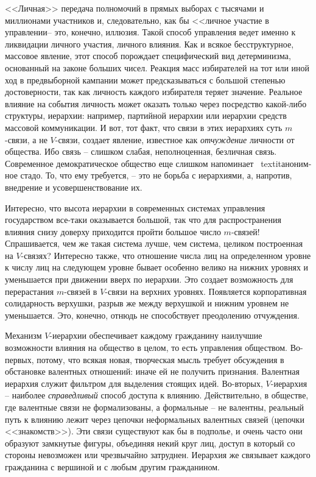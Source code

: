 \documentclass{book}
\begin{document}
<<Личная>> передача полномочий в прямых выборах с тысячами и миллионами участников и, следовательно, как бы <<личное уча­стие в управлении-- это, конечно, иллюзия. Такой способ управле­ния ведет именно к ликвидации личного участия, личного влия­ния. Как и всякое бесструктурное, массовое явление, этот спо­соб порождает специфический вид детерминизма, основанный на законе больших чисел. Реакция масс избирателей на тот или иной ход в предвыборной кампании может предсказываться с большой степенью достоверности, так как личность каждо­го избирателя теряет значение. Реальное влияние на события личность может оказать только через посредство какой-либо структуры, иерархии: например, партийной иерархии или иерар­хии средств массовой коммуникации. И вот, тот факт, что связи в этих иерархиях суть $m$-связи, а не $V$-связи, создает явление, известное как \textit{отчуждение}  личности от общества. Ибо связь -- слишком слабая, неполноценная, безличная связь. Современное демократическое общество еще слишком напоминает \
textit{аноним­ное стадо.}  То, что ему требуется, -- это не борьба с иерархиями, а, напротив, внедрение и усовершенствование их.

Интересно, что высота иерархии в современных системах уп­равления государством все-таки оказывается большой, так что для распространения влияния снизу доверху приходится пройти большое число $m$-связей! Спрашивается, чем же такая система лучше, чем система, целиком построенная на $V$-связях? Инте­ресно также, что отношение числа лиц на определенном уровне к числу лиц на следующем уровне бывает особенно велико на нижних уровнях и уменьшается при движении вверх по иерар­хии. Это создает возможность для перерастания $m$-связей в $V$-связи на верхних уровнях. Появляется корпоративная соли­дарность верхушки, разрыв же между верхушкой и нижним уровнем не уменьшается. Это, конечно, отнюдь не способствует преодолению отчуждения.

Механизм $V$-иерархии обеспечивает каждому гражданину наилучшие возможности влияния на общество в целом, то есть управления обществом. Во-первых, потому, что всякая новая, творческая мысль требует обсуждения в обстановке валентных отношений: иначе ей не получить признания. Валентная иерархия служит фильтром для выделения стоящих идей. Во-вторых, $V$-иерархия -- наиболее \textit{справедливый}  способ до­ступа к влиянию. Действительно, в обществе, где валентные связи не формализованы, а формальные -- не валентны, реальный путь к влиянию лежит через цепочки неформальных валентных связей (цепочки <<знакомств>>). Эти связи существуют как бы в подполье, и очень часто они образуют замкнутые фигуры, объе­диняя некий круг лиц, доступ в который со стороны невозможен или чрезвычайно затруднен. Иерархия же связывает каждого гражданина с вершиной и с любым другим гражданином.
\end{document}
